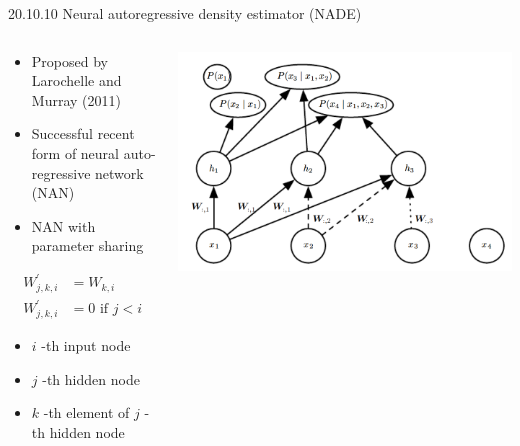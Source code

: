 \documentclass[dvipdfmx,presentation]{beamer}
\begin{document}
\begin{frame}[label={sec:orgheadline41}]{20.10.10 Neural autoregressive density estimator (NADE)}
\begin{columns}
\begin{column}{0.60\columnwidth}
\begin{itemize}
\item Proposed by Larochelle and Murray (2011)
\item Successful recent form of neural auto-regressive network (NAN)
\item NAN with parameter sharing
\end{itemize}
\begin{align*}
W_{j,k,i}^{'} &= W_{k, i} \tag{20.83} \\
W_{j,k,i}^{'} &= 0 \text{ if } j < i
\end{align*}
\begin{itemize}
\item \(i\) -th input node
\item \(j\) -th hidden node
\item \(k\) -th element of \(j\) -th hidden node
\end{itemize}
\end{column}
\begin{column}{0.40\columnwidth}
\centering
\includegraphics[width=1.1\textwidth]{./figure/dlbook_fig20_10.png}
\end{column}
\end{columns}
\end{frame}
\end{document}
